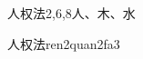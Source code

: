 \begin{entry}{人权法}{2,6,8}{⼈、⽊、⽔}
  \begin{phonetics}{人权法}{ren2quan2fa3}
  \end{phonetics}
\end{entry}
